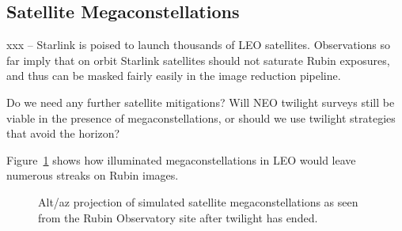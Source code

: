 \subsection{Satellite Megaconstellations}

xxx -- Starlink is poised to launch thousands of LEO satellites. Observations so far imply that on orbit Starlink satellites should not saturate Rubin exposures, and thus can be masked fairly easily in the image reduction pipeline. 

Do we need any further satellite mitigations? Will NEO twilight surveys still be viable in the presence of megaconstellations, or should we use twilight strategies that avoid the horizon?

Figure~\ref{fig:megasat} shows how illuminated megaconstellations in LEO would leave numerous streaks on Rubin images.

\begin{figure}
\caption{Alt/az projection of simulated satellite megaconstellations as seen from the Rubin Observatory site after twilight has ended. } \label{fig:megasat}
\end{figure}

